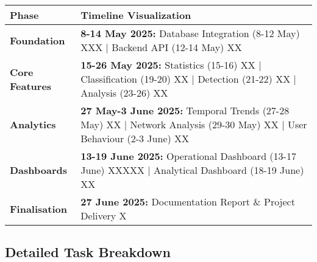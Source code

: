 \documentclass[11pt,a4paper]{article}
\begin{document}
\begin{center}
\small
\begin{tabular}{|l|p{15cm}|}
\hline
\textbf{Phase} & \textbf{Timeline Visualization} \\
\hline
\textbf{Foundation} & 
\begin{minipage}{15cm}
\textbf{8-14 May 2025:} Database Integration (8-12 May) XXX | Backend API (12-14 May) XX
\end{minipage} \\
\hline
\textbf{Core Features} & 
\begin{minipage}{15cm}
\textbf{15-26 May 2025:} Statistics (15-16) XX | Classification (19-20) XX | Detection (21-22) XX | Analysis (23-26) XX
\end{minipage} \\
\hline
\textbf{Analytics} & 
\begin{minipage}{15cm}
\textbf{27 May-3 June 2025:} Temporal Trends (27-28 May) XX | Network Analysis (29-30 May) XX | User Behaviour (2-3 June) XX
\end{minipage} \\
\hline
\textbf{Dashboards} & 
\begin{minipage}{15cm}
\textbf{13-19 June 2025:} Operational Dashboard (13-17 June) XXXXX | Analytical Dashboard (18-19 June) XX
\end{minipage} \\
\hline
\textbf{Finalisation} & 
\begin{minipage}{15cm}
\textbf{27 June 2025:} Documentation Report \& Project Delivery X
\end{minipage} \\
\hline
\end{tabular}
\end{center}

\subsection{Detailed Task Breakdown}
\end{document}
